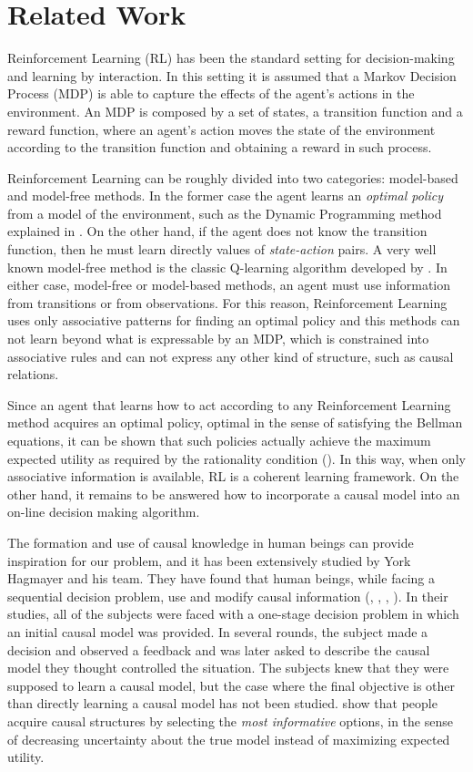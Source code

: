 \documentclass[english,letterpaper,12pt,final]{article}
\theoremstyle{definition}
\begin{document}
\section{Related Work}{\label{Related_Work}}
Reinforcement Learning (RL) has been the standard setting for decision-making and learning by interaction. In this setting it is assumed that a Markov Decision Process (MDP) is able to capture the effects of the agent's actions in the environment. An MDP is composed by a set of states, a transition function and a reward function, where an agent's action moves the state of the environment according to the transition function and obtaining a reward in such process.

Reinforcement Learning can be roughly divided into two categories: model-based and model-free methods. In the former case the agent learns an \textit{optimal policy} from a model of the environment, such as the Dynamic Programming method explained in \cite{sutton1998reinforcement}. On the other hand, if the agent does not know the transition function, then he must learn directly values of \textit{state-action} pairs. A very well known model-free method is the classic Q-learning algorithm developed by \cite{watkins1992q}. In either case, model-free or model-based methods, an agent must use information from transitions or from observations. For this reason, Reinforcement Learning uses only associative patterns for finding an optimal policy and this methods can not learn beyond what is expressable by an MDP, which is constrained into associative rules and can not express any other kind of structure, such as causal relations. 

Since an agent that learns how to act according to any Reinforcement Learning method acquires an optimal policy, optimal in the sense of satisfying the Bellman equations, it can be shown that such policies actually achieve the maximum expected utility as required by the rationality condition (\cite{webb2007game}). In this way, when only associative information is available, RL is a coherent learning framework. On the other hand, it remains to be answered how to incorporate a causal model into an on-line decision making algorithm.

The formation and use of causal knowledge in human beings can provide inspiration for our problem, and it has been extensively studied by York Hagmayer and his team. They have found that human beings, while facing a sequential decision problem, use and modify causal information (\cite{hagmayer2008causal}, \cite{hagmayer2009decision}, \cite{hagmayer2010spontaneous}, \cite{hagmayer2013repeated}). In their studies, all of the subjects were faced with a one-stage decision problem in which an initial causal model was provided. In several rounds, the subject made a decision and observed a feedback and was later asked to describe the causal model they thought controlled the situation. The subjects knew that they were supposed to learn a causal model, but the case where the final objective is other than directly learning a causal model has not been studied. \cite{bramley2015conservative} show that people acquire causal structures by selecting the \textit{most informative} options, in the sense of decreasing uncertainty about the true model instead of maximizing expected utility.
\end{document}
